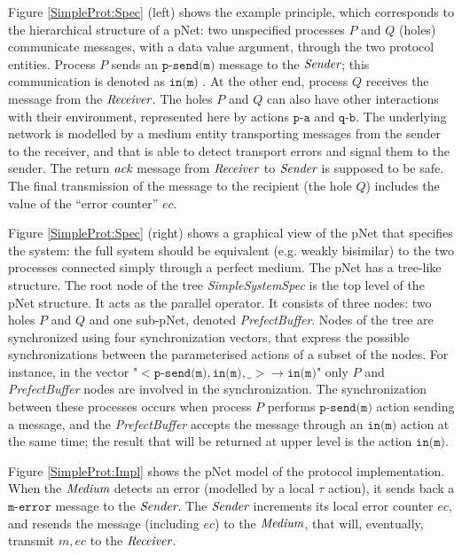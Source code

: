 \documentclass{lmcs}
\newcommand{\nounderline}[1]{#1}
\begin{document}
Figure \ref{SimpleProt:Spec} (left) shows the example principle, which corresponds to the hierarchical structure of a pNet: two unspecified
processes $P$ and $Q$ (holes) communicate messages, with a data value
argument, through the two protocol entities. Process $P$ sends an $\texttt{p-send(m)}$ message to the $\symb{Sender}$; this communication is denoted as $\texttt{\nounderline{in(m)}}$%
.
At the other end, process $Q$ receives the message from the $\symb{Receiver}$. The holes $P$ and $Q$ can also have other interactions with their environment, represented here by actions $\texttt{p-a}$ and $\texttt{q-b}$. The underlying network is modelled by a medium entity transporting messages from the sender to the receiver, and that is able to detect transport errors and signal them to the sender. The return $\symb{ack}$ message from $\symb{Receiver}$ to $\symb{Sender}$ is supposed to be safe. The final transmission of the message to the recipient (the hole $Q$) includes the value of the ``error counter'' $ec$.


Figure \ref{SimpleProt:Spec} (right) shows a graphical view of the pNet that specifies the system:
the full system should be equivalent (e.g.  weakly bisimilar)
to the two processes connected simply through a perfect medium.  
The pNet has a tree-like structure.  The root node of the tree {\it SimpleSystemSpec} is the top level of the pNet structure. It acts as the parallel operator. It consists of three nodes: two holes $P$ and $Q$ and one sub-pNet, denoted {\it PrefectBuffer}. Nodes of the tree are synchronized using four synchronization vectors, that  express the possible synchronizations between the parameterised actions of a subset of the nodes. For instance, in the vector "$< \texttt{p-send(m)},\texttt{in(m)},\_> \rightarrow \texttt{\nounderline{in(m)}}$" only $P$ and {\it PrefectBuffer} nodes are involved in the synchronization. The synchronization between these processes occurs when  process $P$  performs $\texttt{p-send(m)}$  action sending a message, and  the {\it PrefectBuffer} accepts the message through an $\texttt{in(m)}$ action  at the same time; the result that will be returned at upper level is the action  $\texttt{\nounderline{in(m)}}$.


Figure \ref{SimpleProt:Impl} shows the pNet model of the protocol implementation. When the $\symb{Medium}$ detects an error (modelled by a local $\tau$ action), it sends back a $\texttt{m-error}$ message to the $\symb{Sender}$. The $\symb{Sender}$ increments its local error counter $ec$, and resends the message (including $ec$) to the $\symb{Medium}$, that will, eventually, transmit $m,ec$ to the $\symb{Receiver}$. 
\end{document}
